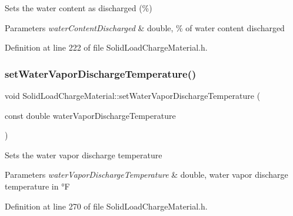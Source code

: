Sets the water content as discharged (\%) 
\begin{DoxyParams}{Parameters}
{\em water\+Content\+Discharged} & double, \% of water content discharged \\
\hline
\end{DoxyParams}


Definition at line 222 of file Solid\+Load\+Charge\+Material.\+h.

\mbox{\label{class_solid_load_charge_material_af7837868e494c16aba5a2c3e1220106d}} 
\subsubsection{\texorpdfstring{set\+Water\+Vapor\+Discharge\+Temperature()}{setWaterVaporDischargeTemperature()}\hspace{0.1cm}{\footnotesize\ttfamily [1/3]}}
{\footnotesize\ttfamily void Solid\+Load\+Charge\+Material\+::set\+Water\+Vapor\+Discharge\+Temperature (\begin{DoxyParamCaption}\item[{const double}]{water\+Vapor\+Discharge\+Temperature }\end{DoxyParamCaption})\hspace{0.3cm}{\ttfamily [inline]}}

Sets the water vapor discharge temperature 
\begin{DoxyParams}{Parameters}
{\em water\+Vapor\+Discharge\+Temperature} & double, water vapor discharge temperature in °F \\
\hline
\end{DoxyParams}


Definition at line 270 of file Solid\+Load\+Charge\+Material.\+h.

\mbox{\label{class_solid_load_charge_material_af7837868e494c16aba5a2c3e1220106d}} 
